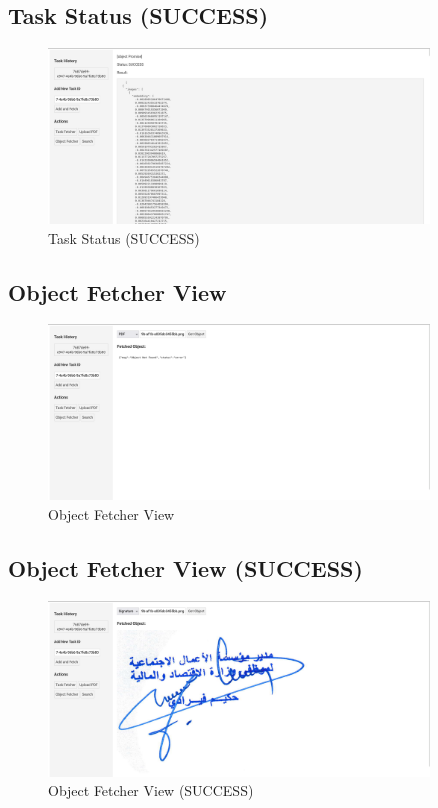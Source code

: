 \subsection{Task Status (SUCCESS)}

\begin{figure}[H]
\centering
  \includegraphics[width=0.9\textwidth]{img/Interfaces/promise_success.png}
\caption{Task Status (SUCCESS)}
\label{Task Status (SUCCESS)}      
\end{figure}

\subsection{Object Fetcher View}

\begin{figure}[H]
\centering
  \includegraphics[width=0.9\textwidth]{img/Interfaces/fetch_object.png}
\caption{Object Fetcher View}
\label{Object Fetcher View}      
\end{figure}
  

\subsection{Object Fetcher View (SUCCESS)}

\begin{figure}[H]
\centering
  \includegraphics[width=0.9\textwidth]{img/Interfaces/fetch_object_success.png}
\caption{Object Fetcher View (SUCCESS)}
\label{Object Fetcher View (SUCCESS)}      
\end{figure}

